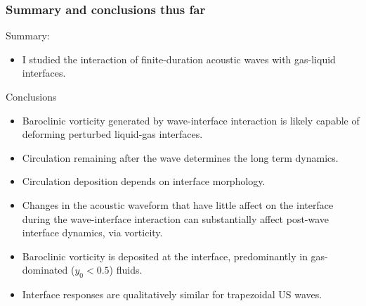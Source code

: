 \begin{frame} \frametitle{\vspace*{0.5cm}Summary and conclusions thus far}
  \small
  Summary:
  \begin{itemize}
  \item I studied the interaction of finite-duration acoustic waves with gas-liquid interfaces.
  \end{itemize}

  Conclusions
  \begin{itemize}
  \item Baroclinic vorticity generated by wave-interface interaction is likely capable of deforming perturbed liquid-gas interfaces.\vfill%
  \item Circulation remaining after the wave determines the long term dynamics.
  \item Circulation deposition depends on interface morphology.
  \item Changes in the acoustic waveform that have little affect on
    the interface during the wave-interface interaction can
    substantially affect post-wave interface dynamics, via
    vorticity.\vfill%
  \item Baroclinic vorticity is deposited at the interface, predominantly in gas-dominated ($y_0<0.5$) fluids.\vfill%
  \item Interface responses are qualitatively similar for trapezoidal US waves.
  \end{itemize}
\end{frame}
